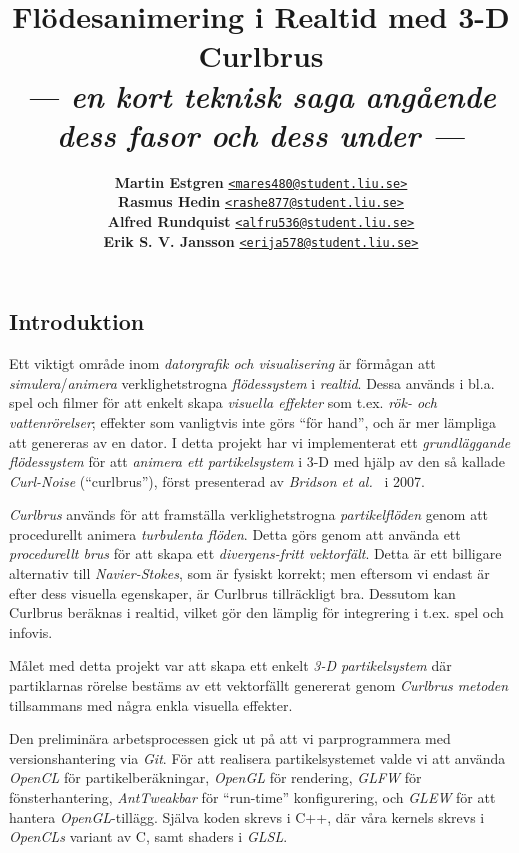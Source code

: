 \documentclass[a4paper]{article}
\date{\vspace{-0.5ex}} %
\title{\vspace{-2.2cm}\textbf{Flödesanimering i Realtid med 3-D Curlbrus}\\
       \Large{\textit{--- en kort teknisk saga angående dess fasor och dess under ---}}\vspace{-0.25cm}}
\author{{\textbf{Martin Estgren}}\;\;\;\;\;\; {\href{mailto:mares480@student.liu.se}{\texttt{<mares480@student.liu.se>}}}\\
        {\textbf{Rasmus Hedin}}\;\;\;\;\;\;\;\; {\href{mailto:rashe877@student.liu.se}{\texttt{<rashe877@student.liu.se>}}}\\
        {\textbf{Alfred Rundquist}}\;\;\; {\href{mailto:alfru536@student.liu.se}{\texttt{<alfru536@student.liu.se>}}}\\
        {\textbf{Erik S. V. Jansson}}\; {\href{mailto:erija578@student.liu.se}{\texttt{<erija578@student.liu.se>}}}}
\begin{document}
    \maketitle
\begin{multicols}{2}

    \section{Introduktion}

    Ett viktigt område inom \emph{datorgrafik och visualisering} är förmågan att \emph{simulera}/\emph{animera} verklighetstrogna \emph{flödessystem} i \emph{realtid}. Dessa används i bl.a. spel och filmer för att enkelt skapa \emph{visuella effekter} som t.ex. \emph{rök- och vattenrörelser}; effekter som vanligtvis inte görs ``för hand'', och är mer lämpliga att genereras av en dator. I detta projekt har vi implementerat ett \emph{grundläggande flödessystem} för att \emph{animera ett partikelsystem} i 3-D med hjälp av den så kallade \emph{Curl-Noise} (``curlbrus''), först presenterad av \emph{Bridson et al.}~\cite{bridson2007curl} i 2007.

    \textit{Curlbrus} används för att framställa verklighetstrogna \emph{partikelflöden} genom att procedurellt animera \emph{turbulenta flöden}. Detta görs genom att använda ett \emph{procedurellt brus} för att skapa ett \emph{divergens-fritt vektorfält}. Detta är ett billigare alternativ till \emph{Navier-Stokes}, som är fysiskt korrekt; men eftersom vi endast är efter dess visuella egenskaper, är Curlbrus tillräckligt bra. Dessutom kan Curlbrus beräknas i realtid, vilket gör den lämplig för integrering i t.ex. spel och infovis.

    Målet med detta projekt var att skapa ett enkelt \emph{3-D partikelsystem} där partiklarnas rörelse bestäms av ett vektorfällt genererat genom \emph{Curlbrus metoden} tillsammans med några enkla visuella effekter.

    Den preliminära arbetsprocessen gick ut på att vi parprogrammera med versionshantering via \textit{Git}. För att realisera partikelsystemet valde vi att använda \textit{OpenCL} för partikelberäkningar, \textit{OpenGL} för rendering, \textit{GLFW} för fönsterhantering, \textit{AntTweakbar} för ``run-time'' konfigurering, och \textit{GLEW} för att hantera \textit{OpenGL}-tillägg. Själva koden skrevs i C++, där våra kernels skrevs i \textit{OpenCLs} variant av C, samt shaders i \textit{GLSL}.

    \vspace{-0.5cm}

\end{multicols}
\end{document}

